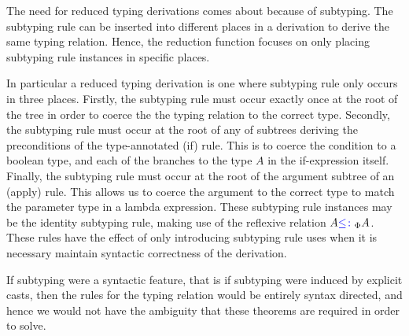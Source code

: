 \documentclass{Report}
\begin{document}
The need for reduced typing derivations comes about because of subtyping. The subtyping rule can be inserted into different places in a derivation to derive the same typing relation. Hence, the reduction function focuses on only placing subtyping rule instances in specific places. 

In particular a reduced typing derivation is one where subtyping rule only occurs in three places. Firstly, the subtyping rule must occur exactly once at the root of the tree in order to coerce the the typing relation to the correct type. Secondly, the subtyping rule must occur at the root of any of subtrees deriving the preconditions of the type-annotated (if) rule. This is to coerce the condition to a boolean type, and each of the branches to the type $A$ in the if-expression itself. Finally, the subtyping rule must occur at the root of the argument subtree of an (apply) rule. This allows us to coerce the argument to the correct type to match the parameter type in a lambda expression. These subtyping rule instances may be the identity subtyping rule, making use of the reflexive relation $A {\color{blue} \leq\colon}_\Phi A$. These rules have the effect of only introducing subtyping rule uses when it is necessary maintain syntactic correctness of the derivation. 

\begin{aside}
    If subtyping were a syntactic feature, that is if subtyping were induced by explicit casts, then the rules for the typing relation would be entirely syntax directed, and hence we would not have the ambiguity that these theorems are required in order to solve.
\end{aside}
\end{document}
